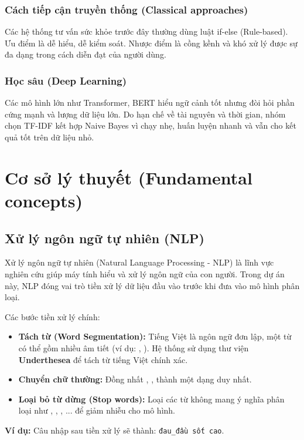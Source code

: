 \documentclass[12pt,a4paper]{report}
\begin{document}
\subsection{Cách tiếp cận truyền thống (Classical approaches)}
Các hệ thống tư vấn sức khỏe trước đây thường dùng luật if-else (Rule-based). Ưu điểm là dễ hiểu, dễ kiểm soát. Nhược điểm là cồng kềnh và khó xử lý được sự đa dạng trong cách diễn đạt của người dùng.

\subsection{Học sâu (Deep Learning)}
Các mô hình lớn như Transformer, BERT hiểu ngữ cảnh tốt nhưng đòi hỏi phần cứng mạnh và lượng dữ liệu lớn. Do hạn chế về tài nguyên và thời gian, nhóm chọn TF-IDF kết hợp Naive Bayes vì chạy nhẹ, huấn luyện nhanh và vẫn cho kết quả tốt trên dữ liệu nhỏ.

\chapter{Cơ sở lý thuyết (Fundamental concepts)}

\section{Xử lý ngôn ngữ tự nhiên (NLP)}
Xử lý ngôn ngữ tự nhiên (Natural Language Processing - NLP) là lĩnh vực nghiên cứu giúp máy tính hiểu và xử lý ngôn ngữ của con người. Trong dự án này, NLP đóng vai trò tiền xử lý dữ liệu đầu vào trước khi đưa vào mô hình phân loại.

Các bước tiền xử lý chính:
\begin{itemize}
    \item \textbf{Tách từ (Word Segmentation):} Tiếng Việt là ngôn ngữ đơn lập, một từ có thể gồm nhiều âm tiết (ví dụ: , ). Hệ thống sử dụng thư viện \textbf{Underthesea} để tách từ tiếng Việt chính xác.
    \item \textbf{Chuyển chữ thường:} Đồng nhất , ,  thành một dạng duy nhất.
    \item \textbf{Loại bỏ từ dừng (Stop words):} Loại các từ không mang ý nghĩa phân loại như , , , ... để giảm nhiễu cho mô hình.
\end{itemize}

\textbf{Ví dụ:} Câu nhập \textit{} sau tiền xử lý sẽ thành: \texttt{đau\_đầu sốt cao}.
\end{document}
